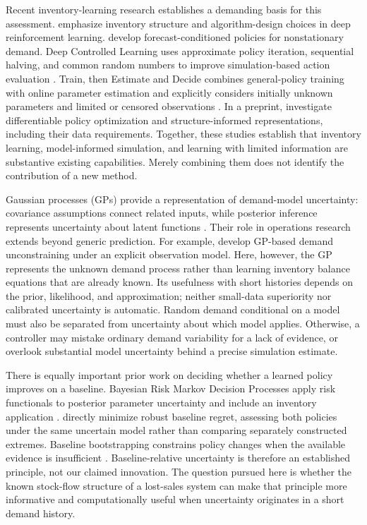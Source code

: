 Recent inventory-learning research establishes a demanding basis for this assessment. \citet{boute2022} emphasize inventory structure and algorithm-design choices in deep reinforcement learning. \citet{dehaybe2024} develop forecast-conditioned policies for nonstationary demand. Deep Controlled Learning uses approximate policy iteration, sequential halving, and common random numbers to improve simulation-based action evaluation \citep{temizoz2025}. Train, then Estimate and Decide combines general-policy training with online parameter estimation and explicitly considers initially unknown parameters and limited or censored observations \citep{temizoz2026}. In a preprint, \citet{alvo2025} investigate differentiable policy optimization and structure-informed representations, including their data requirements. Together, these studies establish that inventory learning, model-informed simulation, and learning with limited information are substantive existing capabilities. Merely combining them does not identify the contribution of a new method.

Gaussian processes (GPs) provide a representation of demand-model uncertainty: covariance assumptions connect related inputs, while posterior inference represents uncertainty about latent functions \citep{rasmussen2006}. Their role in operations research extends beyond generic prediction. For example, \citet{price2019} develop GP-based demand unconstraining under an explicit observation model. Here, however, the GP represents the unknown demand process rather than learning inventory balance equations that are already known. Its usefulness with short histories depends on the prior, likelihood, and approximation; neither small-data superiority nor calibrated uncertainty is automatic. Random demand conditional on a model must also be separated from uncertainty about which model applies. Otherwise, a controller may mistake ordinary demand variability for a lack of evidence, or overlook substantial model uncertainty behind a precise simulation estimate.

There is equally important prior work on deciding whether a learned policy improves on a baseline. Bayesian Risk Markov Decision Processes apply risk functionals to posterior parameter uncertainty and include an inventory application \citep{lin2022}. \citet{petrik2016} directly minimize robust baseline regret, assessing both policies under the same uncertain model rather than comparing separately constructed extremes. Baseline bootstrapping constrains policy changes when the available evidence is insufficient \citep{laroche2019}. Baseline-relative uncertainty is therefore an established principle, not our claimed innovation. The question pursued here is whether the known stock-flow structure of a lost-sales system can make that principle more informative and computationally useful when uncertainty originates in a short demand history.

